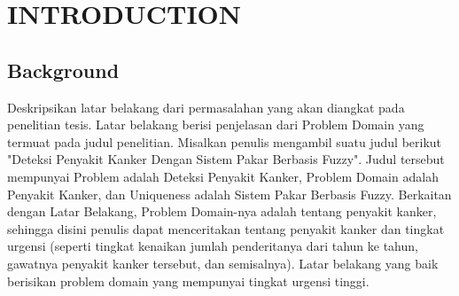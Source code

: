 
\chapter{INTRODUCTION}  %

\ifpdf
    \graphicspath{{Chapter1/Figs/Raster/}{Chapter1/Figs/PDF/}{Chapter1/Figs/}}
\else
    \graphicspath{{Chapter1/Figs/Vector/}{Chapter1/Figs/}}
\fi


\section{Background} %
Deskripsikan latar belakang dari permasalahan yang akan diangkat pada penelitian tesis. Latar belakang berisi penjelasan dari Problem Domain yang termuat pada  judul  penelitian. Misalkan penulis mengambil suatu judul berikut "Deteksi Penyakit Kanker Dengan Sistem Pakar Berbasis Fuzzy". Judul tersebut mempunyai Problem adalah Deteksi Penyakit Kanker, Problem Domain adalah Penyakit Kanker, dan Uniqueness adalah Sistem Pakar Berbasis Fuzzy.
Berkaitan dengan Latar Belakang, Problem Domain-nya adalah tentang penyakit kanker, sehingga disini penulis dapat menceritakan tentang penyakit kanker dan tingkat urgensi (seperti tingkat kenaikan jumlah penderitanya dari tahun ke tahun, gawatnya penyakit kanker tersebut, dan semisalnya). Latar belakang yang baik berisikan problem domain yang mempunyai tingkat urgensi tinggi.


